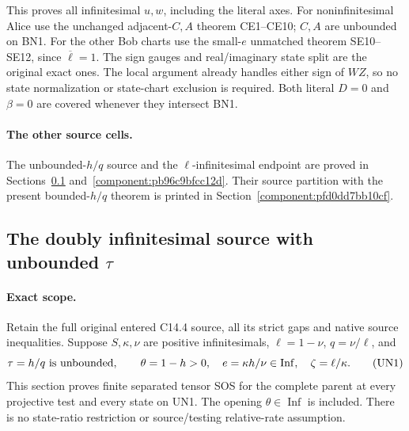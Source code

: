 This proves all infinitesimal $u,w$, including the literal axes.
For noninfinitesimal Alice use the unchanged adjacent-$C,A$ theorem
CE1--CE10; $C,A$ are unbounded on BN1. For the other Bob charts use
the small-$e$ unmatched theorem SE10--SE12, since
$\overline\ell=1$. The sign gauges and real/imaginary state split
are the original exact ones. The local argument already handles
either sign of $WZ$, so no state normalization or state-chart
exclusion is required. Both literal $D=0$ and $\beta=0$ are covered
whenever they intersect BN1.

\paragraph{The other source cells.}
The unbounded-$h/q$ source and the $\ell$-infinitesimal endpoint are proved in Sections~\ref{component:peaa56c1a3c7a} and~\ref{component:pb96c9bfcc12d}. Their source partition with the present bounded-$h/q$ theorem is printed in Section~\ref{component:pfd0dd7bb10cf}.



\subsection{The doubly infinitesimal source with unbounded $\tau$}

\label{component:peaa56c1a3c7a}

\label{peaa56c1a3c7a:sec:new-c144-unbounded-h-ratio}

\paragraph{Exact scope.}
Retain the full original entered C14.4 source, all its strict gaps and
native source inequalities. Suppose $S,\kappa,\nu$ are positive
infinitesimals, $\ell=1-\nu$, $q=\nu/\ell$, and
\[
 \tau=h/q\ \hbox{is unbounded},\qquad
 \theta=1-h>0,\quad e=\kappa h/\nu\in\operatorname{Inf},\quad
 \zeta=\ell/\kappa.
 \tag{UN1}
\]
This section proves finite separated tensor SOS for the complete
parent at every projective test and every state on UN1. The opening
$\theta\in\operatorname{Inf}$ is included. There is no state-ratio
restriction or source/testing relative-rate assumption.

